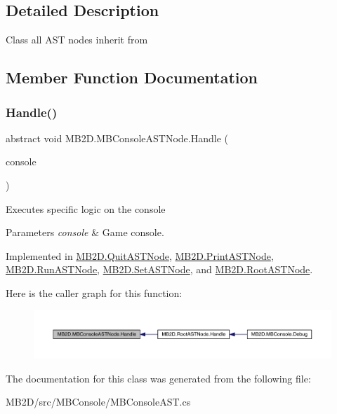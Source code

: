 \subsection{Detailed Description}
Class all A\+ST nodes inherit from 



\subsection{Member Function Documentation}
\hypertarget{class_m_b2_d_1_1_m_b_console_a_s_t_node_aa70a49e61ab623698af4ed8fda4ebbf5}{}\label{class_m_b2_d_1_1_m_b_console_a_s_t_node_aa70a49e61ab623698af4ed8fda4ebbf5} 
\subsubsection{\texorpdfstring{Handle()}{Handle()}}
{\footnotesize\ttfamily abstract void M\+B2\+D.\+M\+B\+Console\+A\+S\+T\+Node.\+Handle (\begin{DoxyParamCaption}\item[{\hyperlink{class_m_b2_d_1_1_m_b_console}{M\+B\+Console}}]{console }\end{DoxyParamCaption})\hspace{0.3cm}{\ttfamily [pure virtual]}}



Executes specific logic on the console 


\begin{DoxyParams}{Parameters}
{\em console} & Game console.\\
\hline
\end{DoxyParams}


Implemented in \hyperlink{class_m_b2_d_1_1_quit_a_s_t_node_a42a27d409a04151393bedcfff8ca5a3c}{M\+B2\+D.\+Quit\+A\+S\+T\+Node}, \hyperlink{class_m_b2_d_1_1_print_a_s_t_node_a61d2408e999df07c1190f6ba8bb6ad3f}{M\+B2\+D.\+Print\+A\+S\+T\+Node}, \hyperlink{class_m_b2_d_1_1_run_a_s_t_node_a20845d86608c81357f4347c29dcaf2c8}{M\+B2\+D.\+Run\+A\+S\+T\+Node}, \hyperlink{class_m_b2_d_1_1_set_a_s_t_node_a54eba248a545f6182c6a5509c4c1a6f2}{M\+B2\+D.\+Set\+A\+S\+T\+Node}, and \hyperlink{class_m_b2_d_1_1_root_a_s_t_node_a16290285c34db0660c0a8006fa182d0d}{M\+B2\+D.\+Root\+A\+S\+T\+Node}.

Here is the caller graph for this function\+:
\nopagebreak
\begin{figure}[H]
\begin{center}
\leavevmode
\includegraphics[width=350pt]{class_m_b2_d_1_1_m_b_console_a_s_t_node_aa70a49e61ab623698af4ed8fda4ebbf5_icgraph}
\end{center}
\end{figure}


The documentation for this class was generated from the following file\+:\begin{DoxyCompactItemize}
\item 
M\+B2\+D/src/\+M\+B\+Console/M\+B\+Console\+A\+S\+T.\+cs\end{DoxyCompactItemize}
